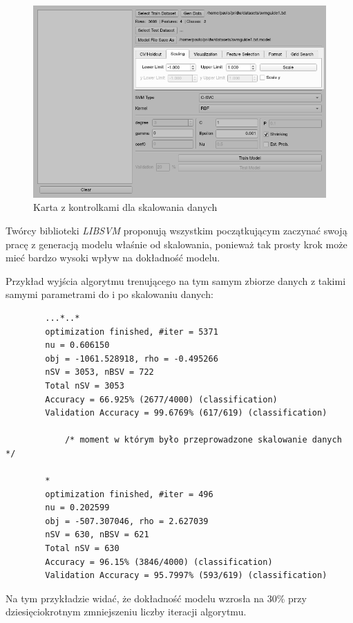 \documentclass[paper=a4, fontsize=11pt]{scrartcl} %
\numberwithin{equation}{section} %
\numberwithin{figure}{section} %
\begin{document}
    \begin{figure}[H]
        \begin{center}
            \includegraphics[scale=0.7]{./img/svm_app_scaling.png}
            \caption{Karta z kontrolkami dla skalowania danych}
            \label{fig:scaling}
        \end{center}
    \end{figure}

    \par Twórcy biblioteki \textit{LIBSVM} proponują wszystkim początkującym zaczynać swoją
    pracę z generacją modelu właśnie od skalowania, ponieważ tak prosty krok może mieć bardzo
    wysoki wpływ na dokładność modelu. \\

    \par Przykład wyjścia algorytmu trenującego na tym samym zbiorze danych z takimi samymi
    parametrami do i po skalowaniu danych:
    
    \begin{verbatim}
        ...*..*
        optimization finished, #iter = 5371
        nu = 0.606150
        obj = -1061.528918, rho = -0.495266
        nSV = 3053, nBSV = 722
        Total nSV = 3053
        Accuracy = 66.925% (2677/4000) (classification)
        Validation Accuracy = 99.6769% (617/619) (classification)

            /* moment w którym było przeprowadzone skalowanie danych */

        *
        optimization finished, #iter = 496
        nu = 0.202599
        obj = -507.307046, rho = 2.627039
        nSV = 630, nBSV = 621
        Total nSV = 630
        Accuracy = 96.15% (3846/4000) (classification)
        Validation Accuracy = 95.7997% (593/619) (classification)
    \end{verbatim}
    \par Na tym przykładzie widać, że dokładność modelu wzrosła na 30\% przy dziesięciokrotnym
    zmniejszeniu liczby iteracji algorytmu.\\
\end{document}
